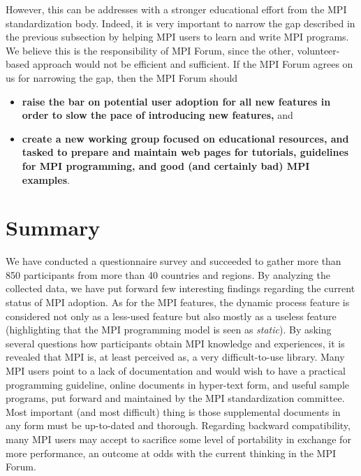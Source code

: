 \documentclass[preprint,5p,times]{elsarticle}
\newcommand{\revision}[2]{{\color{blue}#2}}
\begin{document}
{However, this can be  addresses with a stronger educational effort from the MPI
standardization body. Indeed, it is very important to narrow the gap described in
the previous subsection by helping MPI users to learn and write MPI programs. We
believe this is the responsibility of MPI Forum, since the other,
volunteer-based approach would not be efficient and sufficient. If
\revision{}{the} MPI Forum
agrees \revision{with}{on} us for narrowing the gap, then \revision{}{the} MPI Forum should
%
\begin{itemize}
\item {\bf raise the bar on potential user adoption for all new features in
order to slow the pace of introducing new features,} and
%
\item {\bf create a new working group focused on educational resources, and
tasked to prepare and maintain web pages for tutorials, guidelines for MPI
programming, and good (and certainly bad) MPI examples}.
\end{itemize}

\section{Summary}

We have conducted a questionnaire survey and succeeded to gather more than 850
participants from more than 40 countries and regions. By analyzing the collected
data, we have put forward few interesting findings regarding the current status
of MPI adoption. As for the MPI features, the dynamic process feature is
considered not only as a less-used feature but also mostly as a useless feature
(highlighting that the MPI programming model is seen as {\em static}). By asking
several questions how participants obtain MPI knowledge and experiences, it is
revealed that MPI is, at least perceived as\revision{}{,} a very difficult-to-use library.
 Many MPI users point to a lack of
documentation and would wish to have a practical programming guideline, online
documents in hyper-text form, and useful sample programs, put forward and
maintained by the MPI standardization committee. Most important (and most
difficult) thing is those supplemental documents in any form must be up-to-dated
and thorough. Regarding backward compatibility, many MPI users may accept to
sacrifice some level of portability in exchange for more performance, an outcome
at odds with the current thinking in the MPI Forum.

}
\end{document}

